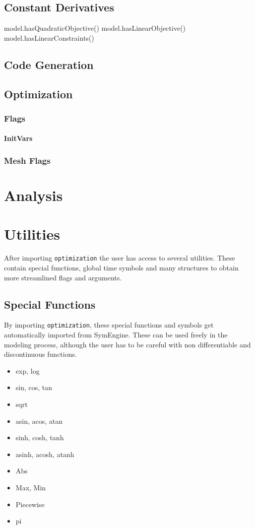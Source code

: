 \documentclass[12pt]{article}
\begin{document}
	\subsection{Constant Derivatives}
	model.hasQuadraticObjective()
	model.hasLinearObjective()
	model.hasLinearConstraints()
	
	
	\subsection{Code Generation}
	
	\subsection{Optimization}
	
	\subsubsection{Flags}
	
	\paragraph{InitVars}
	\label{p:initVars}
	
	\subsubsection{Mesh Flags}
	
	\section{Analysis}
	
	
	\section{Utilities}
	After importing \texttt{optimization} the user has access to several utilities. These contain special functions, global time symbols and many structures to obtain more streamlined flags and arguments.
	
	\subsection{Special Functions}
	\label{c:specialFunction}
	By importing \texttt{optimization}, these special functions and symbols get automatically imported from SymEngine. These can be used freely in the modeling process, although the user has to be careful with non differentiable and discontinuous functions.
	\begin{itemize}
		\item exp, log
		\item sin, cos, tan
		\item sqrt
		\item asin, acos, atan
		\item sinh, cosh, tanh
		\item asinh, acosh, atanh
		\item Abs
		\item Max, Min	
		\item Piecewise
		\item pi	
	\end{itemize}
	
\end{document}
